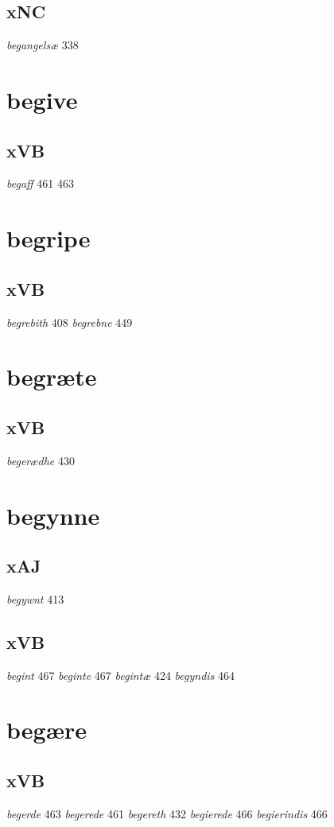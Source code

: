 \documentclass[a4paper,twocolumn]{article}
\begin{document}
\subsection{xNC}
\label{sec:org6bd8cd0}
\emph{begangelsæ} 338 
\section{begive}
\label{sec:orgf814618}
\subsection{xVB}
\label{sec:orga8eb4f4}
\emph{begaff} 461 463 
\section{begripe}
\label{sec:org28d299e}
\subsection{xVB}
\label{sec:org96a82ce}
\emph{begrebith} 408 \emph{begrebne} 449 
\section{begræte}
\label{sec:orgd7033be}
\subsection{xVB}
\label{sec:org7fe1d3f}
\emph{begerædhe} 430 
\section{begynne}
\label{sec:orgfcbf0a0}
\subsection{xAJ}
\label{sec:orgfc97bff}
\emph{begywnt} 413 
\subsection{xVB}
\label{sec:orgefd59dc}
\emph{begint} 467 \emph{beginte} 467 \emph{begintæ} 424 \emph{begyndis} 464 
\section{begære}
\label{sec:org876c68a}
\subsection{xVB}
\label{sec:orgc477f71}
\emph{begerde} 463 \emph{begerede} 461 \emph{begereth} 432 \emph{begierede} 466 \emph{begierindis} 466 
\end{document}
